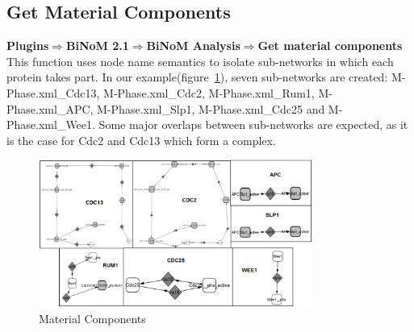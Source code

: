 \subsection{Get Material Components}
\textbf{Plugins$\Rightarrow$BiNoM 2.1$\Rightarrow$BiNoM Analysis$\Rightarrow$Get material components}\\
This function uses node name semantics to isolate sub-networks in which each protein takes part. In our example(figure~\ref{Material_Components}), seven sub-networks are created: M-Phase.xml\_Cdc13, M-Phase.xml\_Cdc2, M-Phase.xml\_Rum1, M-Phase.xml\_APC, M-Phase.xml\_Slp1, M-Phase.xml\_Cdc25 and M-Phase.xml\_Wee1. Some major overlaps between sub-networks are expected, as it is the case for Cdc2 and Cdc13 which form a complex.\\
\begin{figure}
\centering
\includegraphics[width=0.8\textwidth]{graphics/Material_components}
\caption{Material Components}
\label{Material_Components}
\end{figure}

